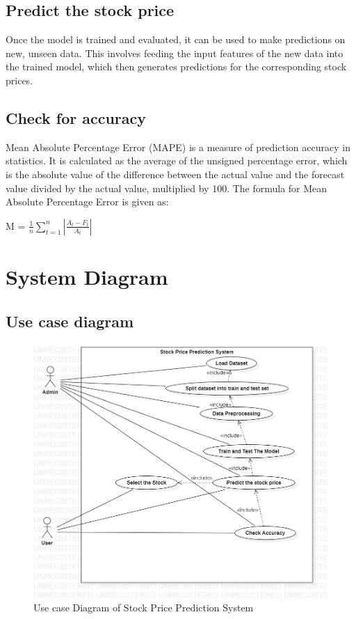 \subsection{Predict the stock price}
\vspace{-18pt}
Once the model is trained and evaluated, it can be used to make predictions on new, unseen data. This involves feeding the input features of the new data into the trained model, which then generates predictions for the corresponding stock prices.
\subsection{Check for accuracy}
\vspace{-18pt}
Mean Absolute Percentage Error (MAPE) is a measure of prediction accuracy in statistics. It is calculated as the average of the unsigned percentage error, which is the absolute value of the difference between the actual value and the forecast value divided by the actual value, multiplied by 100. The formula for Mean Absolute Percentage Error is given as:\par 
M = $\frac{1}{n} \sum_{t=1}^{n} | \frac{A_t - F_t}{A_t}|$
\section{System Diagram}
\vspace{-18pt}
\subsection{Use case diagram}
\newpage 
\begin{figure}
	\includegraphics[width=6in]{images/ucd.jpg} 
	\caption{Use case Diagram of Stock Price Prediction System} %
	\label{Use case Diagram of Stock Price Prediction System} %
\end{figure}
\newpage
